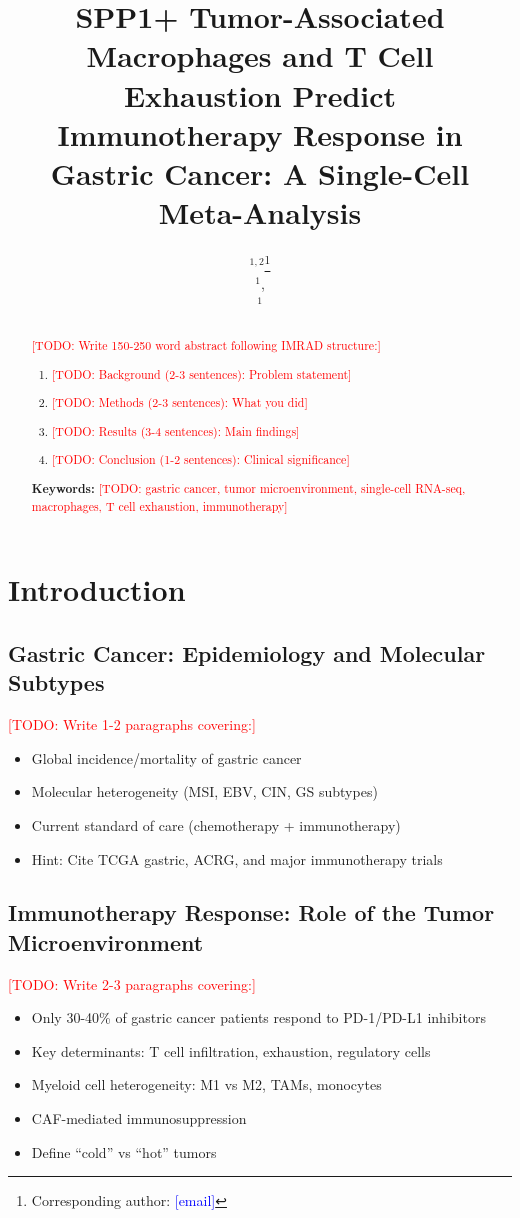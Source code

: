\documentclass[12pt,oneside]{article}
\title{SPP1+ Tumor-Associated Macrophages and T Cell Exhaustion Predict Immunotherapy Response in Gastric Cancer: A Single-Cell Meta-Analysis}
\author{
    \TODO{Your Name}$^{1,2}$\thanks{Corresponding author: \textcolor{blue}{[email]}} \\
    \TODO{Co-Author 2}$^{1}$, \\
    \TODO{Co-Author 3}$^{1}$
}
\date{}
\newcommand{\TODO}[1]{\textcolor{red}{[TODO: #1]}}
\begin{document}
\maketitle

\begin{abstract}
\TODO{Write 150-250 word abstract following IMRAD structure:}
\begin{enumerate}
    \item \TODO{Background (2-3 sentences): Problem statement}
    \item \TODO{Methods (2-3 sentences): What you did}
    \item \TODO{Results (3-4 sentences): Main findings}
    \item \TODO{Conclusion (1-2 sentences): Clinical significance}
\end{enumerate}

\textbf{Keywords:} \TODO{gastric cancer, tumor microenvironment, single-cell RNA-seq, macrophages, T cell exhaustion, immunotherapy}
\end{abstract}

\newpage
\tableofcontents
\newpage

\section{Introduction}

\subsection{Gastric Cancer: Epidemiology and Molecular Subtypes}
\TODO{Write 1-2 paragraphs covering:}
\begin{itemize}
    \item Global incidence/mortality of gastric cancer
    \item Molecular heterogeneity (MSI, EBV, CIN, GS subtypes)
    \item Current standard of care (chemotherapy + immunotherapy)
    \item Hint: Cite TCGA gastric, ACRG, and major immunotherapy trials
\end{itemize}

\subsection{Immunotherapy Response: Role of the Tumor Microenvironment}
\TODO{Write 2-3 paragraphs covering:}
\begin{itemize}
    \item Only 30-40\% of gastric cancer patients respond to PD-1/PD-L1 inhibitors
    \item Key determinants: T cell infiltration, exhaustion, regulatory cells
    \item Myeloid cell heterogeneity: M1 vs M2, TAMs, monocytes
    \item CAF-mediated immunosuppression
    \item Define ``cold'' vs ``hot'' tumors
\end{itemize}
\end{document}
